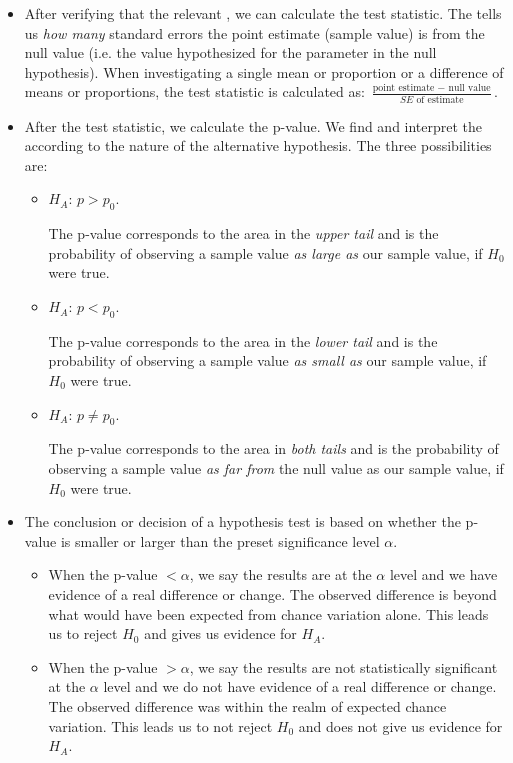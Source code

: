 \begin{itemize}
\item After verifying that the relevant , we can calculate the test statistic.  The  tells us \textit{how many} standard errors the point estimate (sample value) is from the null value (i.e. the value hypothesized for the parameter in the null hypothesis).  When investigating a single mean or proportion or a difference of means or proportions, the test statistic is calculated as: $\frac{\text{point estimate } -\text{ null value}}{SE \text{ of estimate}}$.

\item After the test statistic, we calculate the p-value.  We find and interpret the  according to the nature of the alternative hypothesis.  The three possibilities are:\vspace{-1mm}
\begin{itemize}
\item[] $H_A$: $p>p_0$. \quad\parbox[t]{3.84in}{The p-value corresponds to the area in the \emph{upper tail} and is the probability of observing a sample value \textit{as large as} our sample value, if $H_0$ were true. }
\item[] $H_A$: $p < p_0$. \quad\parbox[t]{3.84in}{The p-value corresponds to the area in the \emph{lower tail} and is the probability of observing a sample value \textit{as small as} our sample value, if $H_0$ were true. }
\item[] $H_A$: $p \ne p_0$. \quad\parbox[t]{3.84in}{The p-value corresponds to the area in \emph{both tails} and is the probability of observing a sample value \textit{as far from} the null value as our sample value, if $H_0$ were true. }
\end{itemize}

\item The conclusion or decision of a hypothesis test is based on whether the p-value is smaller or larger than the preset significance level $\alpha$. \vspace{-1mm}
\begin{itemize}
\item When the  p-value $< \alpha$, we say the results are  at the $\alpha$ level and we have evidence of a real difference or change.  The observed difference is beyond what would have been expected from chance variation alone.  This leads us to reject $H_0$ and gives us evidence for $H_A$.
\item When the  p-value $> \alpha$, we say the results are not statistically significant at the $\alpha$ level and we do not have evidence of a real difference or change.  The observed difference was within the realm of expected chance variation.  This leads us to not reject $H_0$ and does not give us evidence for $H_A$.
\end{itemize}


\end{itemize}

